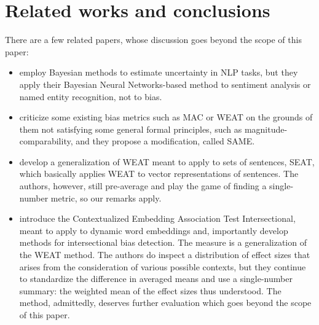 \documentclass{clv3}
\begin{document}
\hypertarget{related-works-and-conclusions}{%
\section{Related works and
conclusions}\label{related-works-and-conclusions}}

\label{sec:related}

There are a few related papers, whose discussion goes beyond the scope
of this paper:

\begin{itemize}
\item  \citet{DBLP:journals/corr/abs-1811-07253} employ Bayesian methods to estimate uncertainty in NLP tasks,
  but they apply their Bayesian Neural Networks-based method to
  sentiment analysis or named entity recognition, not to bias.


\item    \citet{schroder2021evaluating} criticize some existing bias metrics such as \textsf{MAC} or
  \textsf{WEAT} on the grounds of them not satisfying some general
  formal principles, such as magnitude-comparability, and they propose a
  modification, called \textsf{SAME}.

\item \citet{may-etal-2019-measuring} develop a generalization of \textsf{WEAT} meant to apply to
  sets of sentences, \textsf{SEAT}, which basically applies
  \textsf{WEAT} to vector representations of sentences. The authors,
  however, still pre-average and play the game of finding a
  single-number metric, so our remarks apply.

\item \citet{Guo2021CEAT} introduce the Contextualized Embedding Association Test
  Intersectional, meant to apply to dynamic word embeddings and,
  importantly develop methods for intersectional bias detection. The
  measure is a generalization of the WEAT method. The authors do inspect
  a distribution of effect sizes that arises from the consideration of
  various possible contexts, but they continue to standardize the
  difference in averaged means and use a single-number summary: the
  weighted mean of the effect sizes thus understood. The method,
  admittedly, deserves further evaluation which goes beyond the scope of
  this paper.
  

\end{itemize}
\end{document}
